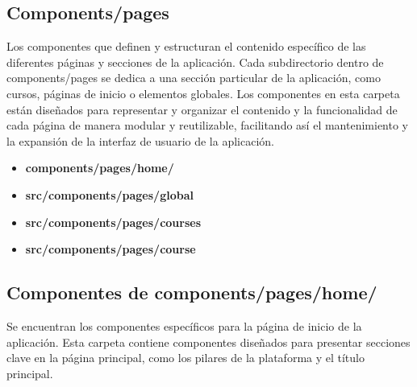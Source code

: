 \subsection{Components/pages} 
Los componentes que definen y estructuran el contenido específico de las diferentes páginas y secciones de la aplicación. Cada subdirectorio dentro de components/pages se dedica a una sección particular de la aplicación, como cursos, páginas de inicio o elementos globales. Los componentes en esta carpeta están diseñados para representar y organizar el contenido y la funcionalidad de cada página de manera modular y reutilizable, facilitando así el mantenimiento y la expansión de la interfaz de usuario de la aplicación.

\begin{itemize}
    \item \textbf{components/pages/home/} 
    \item \textbf{src/components/pages/global}
    \item \textbf{src/components/pages/courses}
    \item \textbf{src/components/pages/course}
\end{itemize}


\subsection{Componentes de components/pages/home/}
Se encuentran los componentes específicos para la página de inicio de la aplicación. Esta carpeta contiene componentes diseñados para presentar secciones clave en la página principal, como los pilares de la plataforma y el título principal.
    
